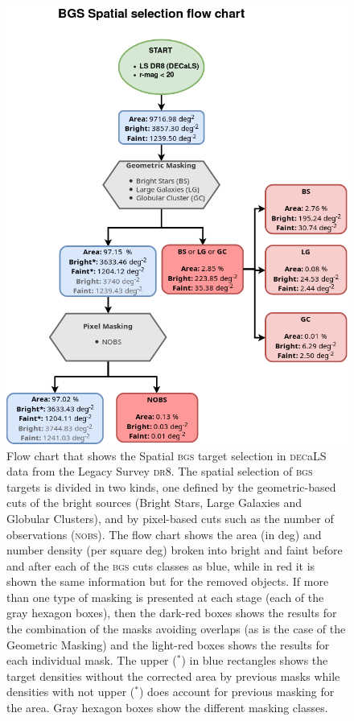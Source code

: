 \documentclass[fleqn,usenatbib]{mnras}
\newcommand{\BGS}{\textsc{bgs}\xspace}
\newcommand{\DECaLS}{\textsc{dec}a\textsc{LS}\xspace}
\newcommand{\DReight}{\textsc{dr8}\xspace}
\newcommand{\NOBS}{\textsc{nobs}\xspace}
\begin{document}
\begin{figure}
	\includegraphics[width=\columnwidth]{images/flow_geo}
    \caption{Flow chart that shows the Spatial \BGS target selection in \DECaLS data from the Legacy Survey \DReight. The spatial selection of \BGS targets is divided in two kinds, one defined by the geometric-based cuts of the bright sources (Bright Stars, Large Galaxies and Globular Clusters), and by pixel-based cuts such as the number of observations (\NOBS). The flow chart shows the area (in deg) and number density (per square deg) broken into bright and faint before and after each of the \BGS cuts classes as blue, while in red it is shown the same information but for the removed objects. If more than one type of masking is presented at each stage (each of the gray hexagon boxes), then the dark-red boxes shows the results for the combination of the masks avoiding overlaps (as is the case of the Geometric Masking) and the light-red boxes shows the results for each individual mask. The upper ($^*$) in blue rectangles shows the target densities without the corrected area by previous masks while densities with not upper ($^*$) does account for previous masking for the area. Gray hexagon boxes show the different masking classes.}
    \label{fig:flow1}
\end{figure}
\end{document}
